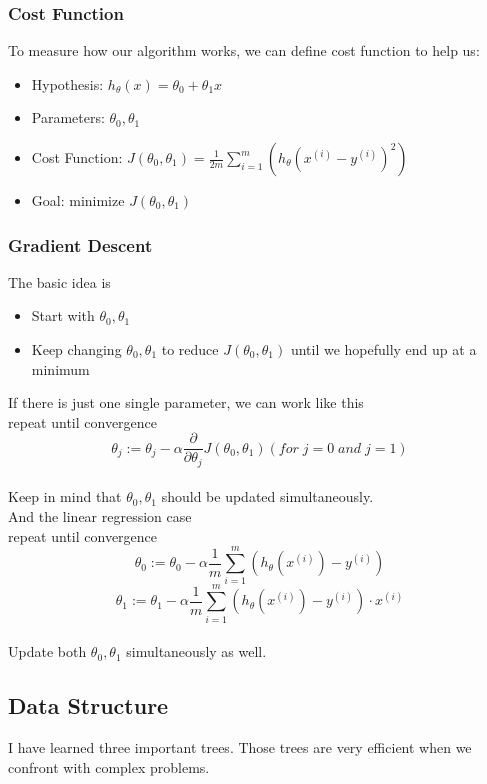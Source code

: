 \documentclass{article}
\begin{document}
\subsubsection{Cost Function}
To measure how our algorithm works, we can define cost function to help us:
\begin{itemize}
  \item Hypothesis: $h_\theta(x) = \theta_0 + \theta_1x$
  \item Parameters: $\theta_0, \theta_1$
  \item Cost Function: $J(\theta_0, \theta_1) = \frac{1}{2m}\sum_{i=1}^m(h_{\theta}(x^{(i)}-y^{(i)})^2)$ 
  \item Goal: minimize $J(\theta_0, \theta_1)$
\end{itemize}

\subsubsection{Gradient Descent}
The basic idea is 
\begin{itemize}
  \item Start with $\theta_0, \theta_1$
  \item Keep changing $\theta_0, \theta_1$ to reduce $J(\theta_0, \theta_1)$ until we hopefully end up at a minimum
\end{itemize}
If there is just one single parameter, we can work like this\\
repeat until convergence{\\
\[\theta_j := \theta_j - \alpha\frac{\partial}{\partial\theta_j}J(\theta_0, \theta_1)(for\; j=0\; and\; j=1)\]
}\\
Keep in mind that $\theta_0, \theta_1$ should be updated simultaneously. \\
And the linear regression case \\
repeat until convergence{\\
\[\theta_0 := \theta_0 - \alpha\frac{1}{m}\sum_{i=1}^{m}(h_{\theta}(x^{(i)}) - y^{(i)})\]
\[\theta_1 := \theta_1 - \alpha\frac{1}{m}\sum_{i=1}^{m}(h_{\theta}(x^{(i)}) - y^{(i)})\cdot x^{(i)}\]
}\\
Update both $\theta_0, \theta_1$ simultaneously as well.

\subsection{Data Structure}
I have learned three important trees. Those trees are very efficient when we confront with complex problems.
\end{document}
